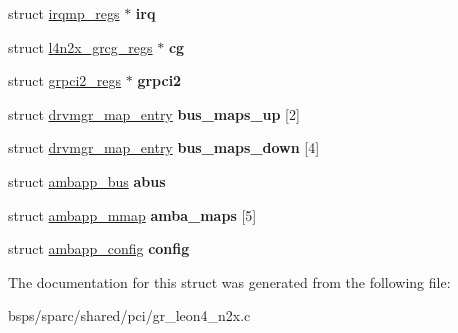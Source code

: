 \begin{DoxyCompactItemize}
\item 
\mbox{\label{structgr__cpci__leon4__n2x__priv_aa12c27a23e40caf3e25a893c359d55c5}} 
struct \mbox{\hyperlink{structirqmp__regs}{irqmp\+\_\+regs}} $\ast$ {\bfseries irq}
\item 
\mbox{\label{structgr__cpci__leon4__n2x__priv_a7410197f17925dc2748946aef83bd8cb}} 
struct \mbox{\hyperlink{structl4n2x__grcg__regs}{l4n2x\+\_\+grcg\+\_\+regs}} $\ast$ {\bfseries cg}
\item 
\mbox{\label{structgr__cpci__leon4__n2x__priv_af8ef271c3222571b07bb6310e6b958ba}} 
struct \mbox{\hyperlink{structgrpci2__regs}{grpci2\+\_\+regs}} $\ast$ {\bfseries grpci2}
\item 
\mbox{\label{structgr__cpci__leon4__n2x__priv_a374476b1c1ef8c112d2a11a34d99ef72}} 
struct \mbox{\hyperlink{structdrvmgr__map__entry}{drvmgr\+\_\+map\+\_\+entry}} {\bfseries bus\+\_\+maps\+\_\+up} \mbox{[}2\mbox{]}
\item 
\mbox{\label{structgr__cpci__leon4__n2x__priv_a27ee4486266a31838985ff6d79984f98}} 
struct \mbox{\hyperlink{structdrvmgr__map__entry}{drvmgr\+\_\+map\+\_\+entry}} {\bfseries bus\+\_\+maps\+\_\+down} \mbox{[}4\mbox{]}
\item 
\mbox{\label{structgr__cpci__leon4__n2x__priv_afeec835afc749f73af061910b7794ec2}} 
struct \mbox{\hyperlink{structambapp__bus}{ambapp\+\_\+bus}} {\bfseries abus}
\item 
\mbox{\label{structgr__cpci__leon4__n2x__priv_a647a72152d7ede7c36b4eed5c6469b73}} 
struct \mbox{\hyperlink{structambapp__mmap}{ambapp\+\_\+mmap}} {\bfseries amba\+\_\+maps} \mbox{[}5\mbox{]}
\item 
\mbox{\label{structgr__cpci__leon4__n2x__priv_a1b7c63ee2b17f1e845a8316cb0243edd}} 
struct \mbox{\hyperlink{structambapp__config}{ambapp\+\_\+config}} {\bfseries config}
\end{DoxyCompactItemize}


The documentation for this struct was generated from the following file\+:\begin{DoxyCompactItemize}
\item 
bsps/sparc/shared/pci/gr\+\_\+leon4\+\_\+n2x.\+c\end{DoxyCompactItemize}

